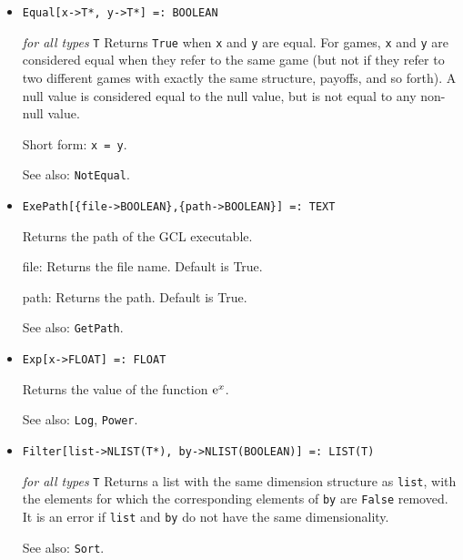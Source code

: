 \begin{itemize}
\item
\protect \large \begin{verbatim}
Equal[x->T*, y->T*] =: BOOLEAN
\end{verbatim}\normalsize

{\it for all types} {\tt T}
\bd
Returns \verb+True+ when \verb+x+ and \verb+y+ are equal.  For games,
\verb+x+ and \verb+y+ are considered equal when they refer to the same
game (but not if they refer to two different games with exactly the
same structure, payoffs, and so forth).  A null value is considered equal
to the null value, but is not equal to any non-null value.
\item
[Short form:] \verb+x = y+.
\item
[See also:] \verb+NotEqual+.
\ed

\item
\protect \large \begin{verbatim}
ExePath[{file->BOOLEAN},{path->BOOLEAN}] =: TEXT 
\end{verbatim} \normalsize

\bd
Returns the path of the GCL executable. 
\bd
\item [file:] Returns the file name.  Default is True.  
\item [path:] Returns the path.  Default is True. 
\ed
\item [See also:] \verb+GetPath+.
\ed

\item
\protect \large \begin{verbatim}
Exp[x->FLOAT] =: FLOAT
\end{verbatim} \normalsize

\bd
Returns the value of the function ${\rm e}^{x}$.
\item [See also:] \verb+Log+, \verb+Power+.
\ed



\item
\protect \large \begin{verbatim}
Filter[list->NLIST(T*), by->NLIST(BOOLEAN)] =: LIST(T)
\end{verbatim} \normalsize

{\it for all types} {\tt T}
\bd
Returns a list with the same dimension structure as \verb+list+, with the
elements for which the corresponding elements of \verb+by+ are \verb+False+
removed.  It is an error if \verb+list+ and \verb+by+ do not have the same
dimensionality.
\item [See also:] \verb+Sort+.
\ed


\end{itemize}
